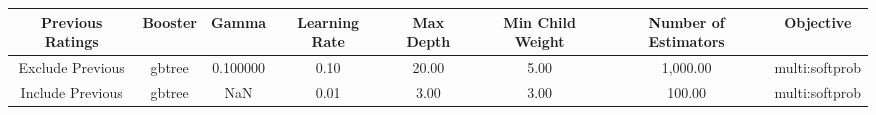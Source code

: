 \footnotesize
\begin{tabular}{cccccccc}
\toprule
Previous Ratings & Booster & Gamma & Learning Rate & Max Depth & Min Child Weight & Number of Estimators & Objective \\
\midrule
Exclude Previous & gbtree & 0.100000 & 0.10 & 20.00 & 5.00 & 1,000.00 & multi:softprob \\
Include Previous & gbtree & NaN & 0.01 & 3.00 & 3.00 & 100.00 & multi:softprob \\
\bottomrule
\end{tabular}

\normalsize